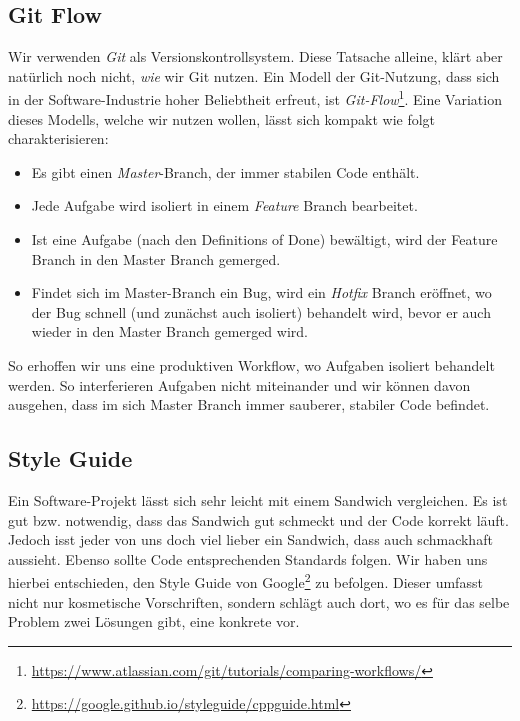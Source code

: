 \subsection{Git Flow}

Wir verwenden \emph{Git} als Versionskontrollsystem. Diese Tatsache alleine,
klärt aber natürlich noch nicht, \emph{wie} wir Git nutzen. Ein Modell der
Git-Nutzung, dass sich in der Software-Industrie hoher Beliebtheit erfreut, ist
\emph{Git-Flow}\footnote{\url{https://www.atlassian.com/git/tutorials/comparing-workflows/}}. Eine
Variation dieses Modells, welche wir nutzen wollen, lässt sich kompakt wie folgt
charakterisieren:

\begin{itemize}
  \item Es gibt einen \emph{Master}-Branch, der immer stabilen Code enthält.
  \item Jede Aufgabe wird isoliert in einem \emph{Feature} Branch bearbeitet.
  \item Ist eine Aufgabe (nach den Definitions of Done) bewältigt, wird der
    Feature Branch in den Master Branch gemerged.
  \item Findet sich im Master-Branch ein Bug, wird ein \emph{Hotfix} Branch
    eröffnet, wo der Bug schnell (und zunächst auch isoliert) behandelt wird,
    bevor er auch wieder in den Master Branch gemerged wird.
\end{itemize}

So erhoffen wir uns eine produktiven Workflow, wo Aufgaben isoliert behandelt
werden. So interferieren Aufgaben nicht miteinander und wir können davon
ausgehen, dass im sich Master Branch immer sauberer, stabiler Code befindet.

\subsection{Style Guide}

Ein Software-Projekt lässt sich sehr leicht mit einem Sandwich vergleichen. Es
ist gut bzw. notwendig, dass das Sandwich gut schmeckt und der Code korrekt
läuft. Jedoch isst jeder von uns doch viel lieber ein Sandwich, dass auch
schmackhaft aussieht. Ebenso sollte Code entsprechenden Standards folgen. Wir
haben uns hierbei entschieden, den Style Guide von Google\footnote{\url{https://google.github.io/styleguide/cppguide.html}} zu
befolgen. Dieser umfasst nicht nur kosmetische Vorschriften, sondern schlägt
auch dort, wo es für das selbe Problem zwei Lösungen gibt, eine konkrete vor.

